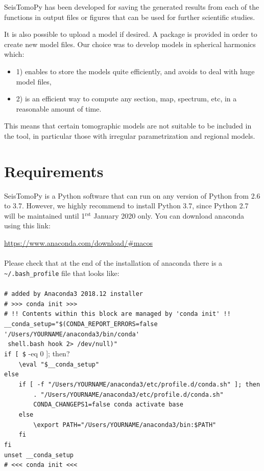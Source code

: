 \documentclass[12pt]{article}
\begin{document}
SeisTomoPy has been developed for saving the generated results from each of the functions in output files or figures that can be used for further scientific studies. 

It is also possible to upload a model if desired. A package is provided in order to create new model files. Our choice was to  develop models in spherical harmonics which:
\begin{itemize}
\item 1) enables to store the models quite efficiently, and avoids to deal with huge model files,
\item 2) is an efficient way to compute any section, map, spectrum, etc, in a reasonable amount of time.
\end{itemize}
This means that certain tomographic models are not suitable to be included in the tool, in particular those with irregular parametrization and regional models. 

\newpage

\section{Requirements}

SeisTomoPy is a Python software that can run on any version of Python from 2.6 to 3.7. However, we highly recommend to install Python 3.7, since Python 2.7 will be maintained until 1$^\textrm{rst}$ January 2020 only. You can download anaconda using this link:

\noindent \url{https://www.anaconda.com/download/#macos}
\\
\\
Please check that at the end of the installation of anaconda there is a \verb?~/.bash_profile? file that looks like:
\\
\\
\verb?# added by Anaconda3 2018.12 installer?\\
\verb?# >>> conda init >>>?\\
\verb?# !! Contents within this block are managed by 'conda init' !!?\\
\verb?__conda_setup="$(CONDA_REPORT_ERRORS=false '/Users/YOURNAME/anaconda3/bin/conda'?\\
\verb? shell.bash hook 2> /dev/null)"?\\
\verb?if [ $? -eq 0 ]; then?\\
\verb?    \eval "$__conda_setup"?\\
\verb?else?\\
\verb?    if [ -f "/Users/YOURNAME/anaconda3/etc/profile.d/conda.sh" ]; then?\\
\verb?        . "/Users/YOURNAME/anaconda3/etc/profile.d/conda.sh"?\\
\verb?        CONDA_CHANGEPS1=false conda activate base?\\
\verb?    else?\\
\verb?        \export PATH="/Users/YOURNAME/anaconda3/bin:$PATH"?\\
\verb?    fi?\\
\verb?fi?\\
\verb?unset __conda_setup?\\
\verb?# <<< conda init <<<?\\
\end{document}
